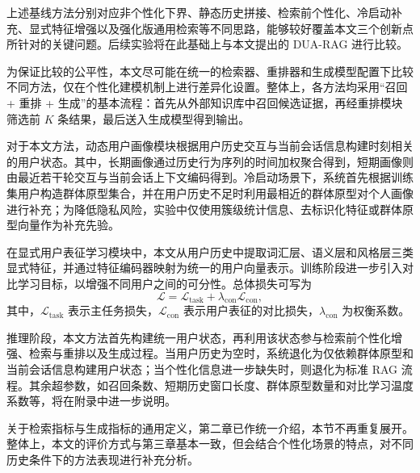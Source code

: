 上述基线方法分别对应非个性化下界、静态历史拼接、检索前个性化、冷启动补充、显式特征增强以及强化版通用检索等不同思路，能够较好覆盖本文三个创新点所针对的关键问题。后续实验将在此基础上与本文提出的 DUA-RAG 进行比较。

\vspace{0.5em}


\vspace{0.5em}

为保证比较的公平性，本文尽可能在统一的检索器、重排器和生成模型配置下比较不同方法，仅在个性化建模机制上进行差异化设置。整体上，各方法均采用“召回 + 重排 + 生成”的基本流程：首先从外部知识库中召回候选证据，再经重排模块筛选前 $K$ 条结果，最后送入生成模型得到输出。

对于本文方法，动态用户画像模块根据用户历史交互与当前会话信息构建时刻相关的用户状态。其中，长期画像通过历史行为序列的时间加权聚合得到，短期画像则由最近若干轮交互与当前会话上下文编码得到。冷启动场景下，系统首先根据训练集用户构造群体原型集合，并在用户历史不足时利用最相近的群体原型对个人画像进行补充；为降低隐私风险，实验中仅使用簇级统计信息、去标识化特征或群体原型向量作为补充先验。

在显式用户表征学习模块中，本文从用户历史中提取词汇层、语义层和风格层三类显式特征，并通过特征编码器映射为统一的用户向量表示。训练阶段进一步引入对比学习目标，以增强不同用户之间的可分性。总体损失可写为
\begin{equation}
\mathcal{L}=\mathcal{L}_{\mathrm{task}}+\lambda_{\mathrm{con}}\mathcal{L}_{\mathrm{con}},
\end{equation}
其中，$\mathcal{L}_{\mathrm{task}}$ 表示主任务损失，$\mathcal{L}_{\mathrm{con}}$ 表示用户表征的对比损失，$\lambda_{\mathrm{con}}$ 为权衡系数。

推理阶段，本文方法首先构建统一用户状态，再利用该状态参与检索前个性化增强、检索与重排以及生成过程。当用户历史为空时，系统退化为仅依赖群体原型和当前会话信息构建用户状态；当个性化信息进一步缺失时，则退化为标准 RAG 流程。其余超参数，如召回条数、短期历史窗口长度、群体原型数量和对比学习温度系数等，将在附录中进一步说明。

\vspace{0.8em}


\vspace{0.5em}

关于检索指标与生成指标的通用定义，第二章已作统一介绍，本节不再重复展开。整体上，本文的评价方式与第三章基本一致，但会结合个性化场景的特点，对不同历史条件下的方法表现进行补充分析。

